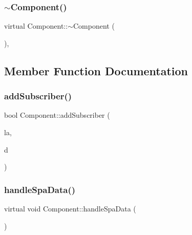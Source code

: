 \mbox{\label{classComponent_a2e9aa4348314d981f05f67397ad2f872}} 
\subsubsection{\texorpdfstring{$\sim$\+Component()}{~Component()}}
{\footnotesize\ttfamily virtual Component\+::$\sim$\+Component (\begin{DoxyParamCaption}{ }\end{DoxyParamCaption})\hspace{0.3cm}{\ttfamily [inline]}, {\ttfamily [virtual]}}



\subsection{Member Function Documentation}
\mbox{\label{classComponent_a54c0c489eec4e4f6b23655a734fc00d4}} 
\subsubsection{\texorpdfstring{add\+Subscriber()}{addSubscriber()}}
{\footnotesize\ttfamily bool Component\+::add\+Subscriber (\begin{DoxyParamCaption}\item[{\hyperlink{structLogicalAddress}{Logical\+Address}}]{la,  }\item[{uint16\+\_\+t}]{d }\end{DoxyParamCaption})}

\mbox{\label{classComponent_a0f71f7a7ff6c0e7cd28692b6890a0058}} 
\subsubsection{\texorpdfstring{handle\+Spa\+Data()}{handleSpaData()}}
{\footnotesize\ttfamily virtual void Component\+::handle\+Spa\+Data (\begin{DoxyParamCaption}\item[{\hyperlink{structSpaMessage}{Spa\+Message} $\ast$}]{ }\end{DoxyParamCaption})\hspace{0.3cm}{\ttfamily [pure virtual]}}



